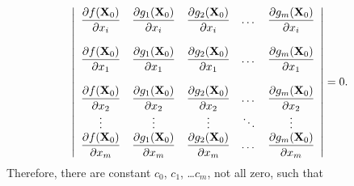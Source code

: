 \documentclass{article}
\newcommand{\dst}{\displaystyle}
\begin{document}
$$
\left|\begin{array}{ccccccc}
\dst{\frac{\partial f({\bf X}_{0})}{\partial x_{i}}}&
\dst{\frac{\partial g_{1}({\bf X}_{0})}{\partial x_{i}}}&
\dst{\frac{\partial g_{2}({\bf X}_{0})}{\partial x_{i}}}&\dots&
\dst{\frac{\partial g_{m}({\bf X}_{0})}{\partial x_{i}}}\\\\
\dst{\frac{\partial f({\bf X}_{0})}{\partial x_{1}}}&
\dst{\frac{\partial g_{1}({\bf X}_{0})}{\partial x_{1}}}&
\dst{\frac{\partial g_{2}({\bf X}_{0})}{\partial x_{1}}}&\dots&
\dst{\frac{\partial g_{m}({\bf X}_{0})}{\partial x_{1}}}\\\\
\dst{\frac{\partial f({\bf X}_{0})}{\partial x_{2}}}&
\dst{\frac{\partial g_{1}({\bf X}_{0})}{\partial x_{2}}}&
\dst{\frac{\partial g_{2}({\bf X}_{0})}{\partial x_{2}}}&\dots&
\dst{\frac{\partial g_{m}({\bf X}_{0})}{\partial x_{2}}}\\
\vdots&\vdots&\vdots&\ddots&\vdots\\
\dst{\frac{\partial f({\bf X}_{0})}{\partial x_{m}}}&
\dst{\frac{\partial g_{1}({\bf X}_{0})}{\partial x_{m}}}&
\dst{\frac{\partial g_{2}({\bf X}_{0})}{\partial x_{m}}}&\dots&
\dst{\frac{\partial g_{m}({\bf X}_{0})}{\partial x_{m}}}
\end{array}\right|=0.
$$
Therefore, there are constant $c_{0}$, $c_{1}$, \dots $c_{m}$, not all
zero, such that
\end{document}

